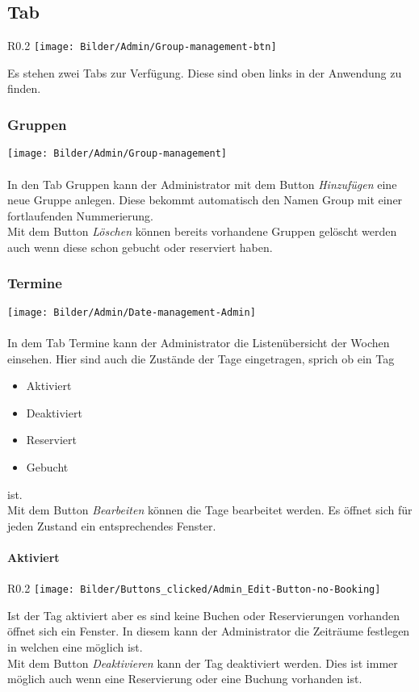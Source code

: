 \subsection{Tab}

\begin{wrapfigure}{R}{0.2\textwidth}
	\centering
	\texttt{[image: Bilder/Admin/Group-management-btn]}
\end{wrapfigure}
Es stehen zwei Tabs zur Verfügung. Diese sind oben links in der Anwendung zu finden.


\subsubsection{Gruppen}
	\texttt{[image: Bilder/Admin/Group-management]}
	\\
	\\	
In den Tab Gruppen kann der Administrator mit dem Button \textit{Hinzufügen} eine neue Gruppe anlegen. Diese bekommt automatisch den Namen Group mit einer fortlaufenden Nummerierung.\\Mit dem Button \textit{Löschen} können bereits vorhandene Gruppen gelöscht werden auch wenn diese schon gebucht oder reserviert haben.

\subsubsection{Termine}
	\texttt{[image: Bilder/Admin/Date-management-Admin]}
	\\
	\\
In dem Tab Termine kann der Administrator die Listenübersicht der Wochen einsehen. Hier sind auch die Zustände der Tage eingetragen, sprich ob ein Tag
\begin{itemize}
	\item Aktiviert 
	\item Deaktiviert 
	\item Reserviert 
	\item Gebucht
\end{itemize}
ist.
\\ Mit dem Button \textit{Bearbeiten} können die Tage bearbeitet werden. Es öffnet sich für jeden Zustand ein entsprechendes Fenster.


\paragraph{Aktiviert}
\begin{wrapfigure}{R}{0.2\textwidth}
	\centering
	\texttt{[image: Bilder/Buttons\_clicked/Admin\_Edit-Button-no-Booking]}
\end{wrapfigure}
Ist der Tag aktiviert aber es sind keine Buchen oder Reservierungen vorhanden öffnet sich ein Fenster. In diesem kann der Administrator die Zeiträume festlegen in welchen eine möglich ist. 
\\Mit dem Button \textit{Deaktivieren} kann der Tag deaktiviert werden. Dies ist immer möglich auch wenn eine Reservierung oder eine Buchung vorhanden ist.


